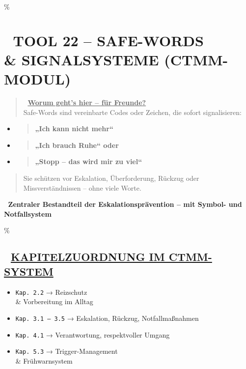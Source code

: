 \hypertarget{tool-22-safe-words-signalsysteme-ctmm-modul}{\%
\section{\texorpdfstring{\textbf{🛑 TOOL 22 -- SAFE-WORDS \\& SIGNALSYSTEME (CTMM-MODUL)}}{🛑 TOOL 22 -- SAFE-WORDS \\& SIGNALSYSTEME (CTMM-MODUL)}}\label{tool-22-safe-words-signalsysteme-ctmm-modul}}

\begin{quote}
🧠 \textbf{\ul{Worum geht's hier -- für Freunde?}}\\
Safe-Words sind vereinbarte Codes oder Zeichen, die sofort signalisieren:
\end{quote}

\begin{itemize}
\item
  \begin{quote}
  \textbf{„Ich kann nicht mehr``}
  \end{quote}
\item
  \begin{quote}
  \textbf{„Ich brauch Ruhe`` oder}
  \end{quote}
\item
  \begin{quote}
  \textbf{„Stopp -- das wird mir zu viel``}
  \end{quote}
\end{itemize}

\begin{quote}
Sie schützen vor Eskalation, Überforderung, Rückzug oder Missverständnissen -- ohne viele Worte.
\end{quote}

🧩 \textbf{Zentraler Bestandteil der Eskalationsprävention -- mit Symbol- und Notfallsystem}

\hypertarget{kapitelzuordnung-im-ctmm-system}{\%
\subsection{\texorpdfstring{📘 \textbf{\ul{KAPITELZUORDNUNG IM CTMM-SYSTEM}}}{📘 KAPITELZUORDNUNG IM CTMM-SYSTEM}}\label{kapitelzuordnung-im-ctmm-system}}

\begin{itemize}
\tightlist
\item
  \texttt{Kap.\ }\texttt{2.2} → Reizschutz \\& Vorbereitung im Alltag
\item
  \texttt{Kap.\ }\texttt{3.1\ –\ 3.5} → Eskalation, Rückzug, Notfallmaßnahmen
\item
  \texttt{Kap.\ }\texttt{4.1} → Verantwortung, respektvoller Umgang
\item
  \texttt{Kap.\ }\texttt{5.3} → Trigger-Management \\& Frühwarnsystem
\end{itemize}

